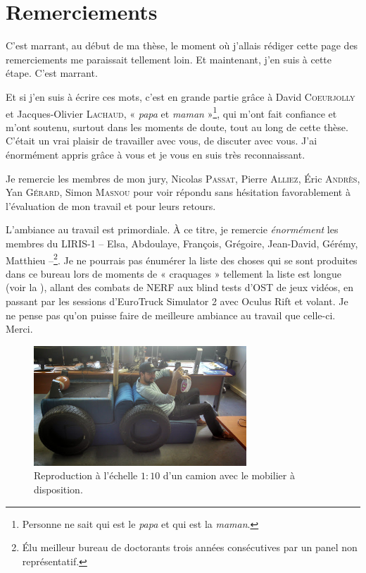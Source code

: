 \chapter*{Remerciements}
\label{sec:remerciements}
\vspace*{-10mm}


C'est marrant, au début de ma thèse, le moment où j'allais rédiger cette page
des remerciements me paraissait tellement loin. Et maintenant, j'en suis à cette
étape. C'est marrant.

Et si j'en suis à écrire ces mots, c'est en grande partie grâce à David \textsc{Coeurjolly} et
Jacques-Olivier \textsc{Lachaud}, « \emph{papa} et \emph{maman} »\footnote{Personne ne sait qui
est le \emph{papa} et qui est la \emph{maman}.}, qui m'ont fait confiance et
m'ont soutenu, surtout dans les moments de doute, tout au long de cette thèse.
C'était un vrai plaisir de travailler avec vous, de discuter avec vous. J'ai
énormément appris grâce à vous et je vous en suis très reconnaissant.

Je remercie les membres de mon jury, Nicolas \textsc{Passat}, Pierre
\textsc{Alliez}, Éric \textsc{Andrès}, Yan \textsc{Gérard}, Simon
\textsc{Masnou} pour voir répondu sans hésitation favorablement à l'évaluation
de mon travail et pour leurs retours.

L'ambiance au travail est primordiale. À ce titre, je remercie \emph{énormément}
les membres du LIRIS-1 -- Elsa, Abdoulaye, François, Grégoire, Jean-David,
Gérémy, Matthieu --\footnote{Élu meilleur bureau de doctorants trois années
consécutives par un panel non représentatif.}. Je ne pourrais pas énumérer la
liste des choses qui se sont produites dans ce bureau lors de moments de «
craquages » tellement la liste est longue (voir la
), allant des combats de NERF aux blind tests
d'OST de jeux vidéos, en passant par les sessions d'EuroTruck Simulator 2 avec
Oculus Rift et volant. Je ne pense pas qu'on puisse faire de meilleure ambiance
au travail que celle-ci. Merci.
%
\begin{figure}[ht]{
  \begin{center}
    \includegraphics[width=8cm]{images/misc/JeremInTheTruck}
  \end{center}
  \caption{Reproduction à l'échelle $1:10$ d'un camion avec le mobilier à disposition.\label{fig:jerem-in-the-truck}}}
\end{figure}

